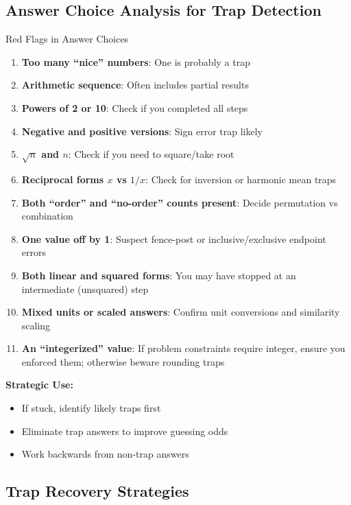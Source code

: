 \documentclass{article}
\begin{document}
\subsection{Answer Choice Analysis for Trap Detection}
\hypertarget{answer-flags}{}

\begin{trapbox}{Red Flags in Answer Choices}
\begin{enumerate}
\item \textbf{Too many ``nice'' numbers}: One is probably a trap
\item \textbf{Arithmetic sequence}: Often includes partial results
\item \textbf{Powers of 2 or 10}: Check if you completed all steps
\item \textbf{Negative and positive versions}: Sign error trap likely
\item \textbf{$\sqrt{n}$ and $n$}: Check if you need to square/take root
\item \textbf{Reciprocal forms $x$ vs $1/x$}: Check for inversion or harmonic mean traps
\item \textbf{Both ``order'' and ``no-order'' counts present}: Decide permutation vs combination
\item \textbf{One value off by 1}: Suspect fence-post or inclusive/exclusive endpoint errors
\item \textbf{Both linear and squared forms}: You may have stopped at an intermediate (unsquared) step
\item \textbf{Mixed units or scaled answers}: Confirm unit conversions and similarity scaling
\item \textbf{An ``integerized'' value}: If problem constraints require integer, ensure you enforced them; otherwise beware rounding traps
\end{enumerate}

\textbf{Strategic Use:}
\begin{itemize}
\item If stuck, identify likely traps first
\item Eliminate trap answers to improve guessing odds
\item Work backwards from non-trap answers
\end{itemize}
\end{trapbox}

\subsection{Trap Recovery Strategies}
\end{document}
